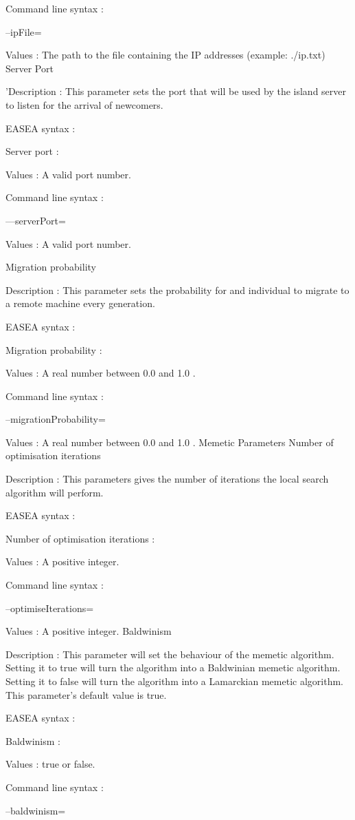 \documentclass{article}
\begin{document}
Command line syntax :

--ipFile=

Values : The path to the file containing the IP addresses (example: ./ip.txt)
Server Port

'Description :
This parameter sets the port that will be used by the island server to listen for the arrival of newcomers.

EASEA syntax :

Server port :

Values : A valid port number.

Command line syntax :

---serverPort=

Values : A valid port number.


Migration probability

Description :
This parameter sets the probability for and individual to migrate to a remote machine every generation.

EASEA syntax :

Migration probability :

Values : A real number between 0.0 and 1.0 .

Command line syntax :

--migrationProbability=

Values : A real number between 0.0 and 1.0 .
Memetic Parameters
Number of optimisation iterations

Description :
This parameters gives the number of iterations the local search algorithm will perform.

EASEA syntax :

Number of optimisation iterations :

Values : A positive integer.

Command line syntax :

--optimiseIterations=

Values : A positive integer.
Baldwinism

Description :
This parameter will set the behaviour of the memetic algorithm. Setting it to true will turn the algorithm into a Baldwinian memetic algorithm. Setting it to false will turn the algorithm into a Lamarckian memetic algorithm. This parameter's default value is true.

EASEA syntax :

Baldwinism :

Values : true or false.

Command line syntax :

--baldwinism=
\end{document}
